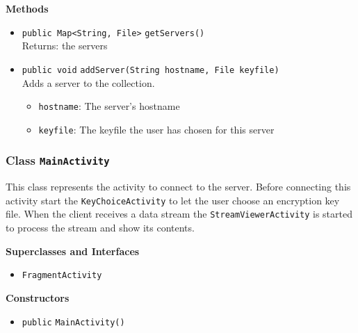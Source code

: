 \textbf{Methods}
\begin{itemize}
\item \lstinline|public Map<String, File>| \lstinline|getServers|\lstinline|()|\\
Returns: the servers



\item \lstinline|public void| \lstinline|addServer|\lstinline|(String hostname, File keyfile)|\\
Adds a server to the collection.
\begin{itemize}
\item \lstinline|hostname|: The server's hostname
\item \lstinline|keyfile|: The keyfile the user has chosen for this server
\end{itemize}



\end{itemize}

\subsubsection{Class \lstinline|MainActivity|}
This class represents the activity to connect to the server.
 Before connecting this activity start the \lstinline|KeyChoiceActivity| to
 let the user choose an encryption key file. When the client receives a
 data stream the \lstinline|StreamViewerActivity| is started to process the
 stream and show its contents. \\



\textbf{Superclasses and Interfaces}
\begin{itemize}
\item \lstinline|FragmentActivity|
\end{itemize}



\textbf{Constructors}
\begin{itemize}
\item \lstinline|public| \lstinline|MainActivity|\lstinline|()|




\end{itemize}



